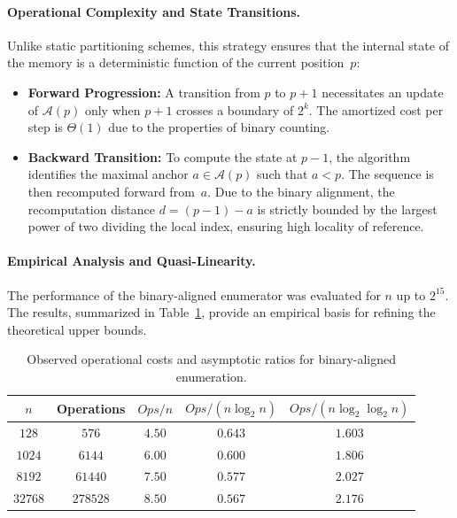 \documentclass[a4paper,10pt]{article}
\begin{document}
\paragraph{Operational Complexity and State Transitions.}
Unlike static partitioning schemes, this strategy ensures that the internal state of the memory is a deterministic function of the current position~\(p\):
\begin{itemize}
    \item \textbf{Forward Progression:} A transition from \(p\) to \(p+1\) necessitates an update of \(\mathcal{A}(p)\) only when \(p+1\) crosses a boundary of \(2^k\). The amortized cost per step is \(\Theta(1)\) due to the properties of binary counting.
    \item \textbf{Backward Transition:} To compute the state at \(p-1\), the algorithm identifies the maximal anchor \(a \in \mathcal{A}(p)\) such that \(a < p\). The sequence is then recomputed forward from~\(a\). Due to the binary alignment, the recomputation distance \(d = (p-1) - a\) is strictly bounded by the largest power of two dividing the local index, ensuring high locality of reference.
\end{itemize}

\paragraph{Empirical Analysis and Quasi-Linearity.}
The performance of the binary-aligned enumerator was evaluated for \(n\) up to \(2^{15}\). The results, summarized in Table~\ref{tab:complexity-ratios}, provide an empirical basis for refining the theoretical upper bounds.

\begin{table}[h]
\centering
\caption{Observed operational costs and asymptotic ratios for binary-aligned enumeration.}
\label{tab:complexity-ratios}
\begin{tabular}{ccccc}
\toprule
$n$ & Operations & $Ops / n$ & $Ops / (n \log_2 n)$ & $Ops / (n \log_2 \log_2 n)$ \\
\midrule
$128$   & $576$    & $4.50$ & $0.643$ & $1.603$ \\
$1024$  & $6144$   & $6.00$ & $0.600$ & $1.806$ \\
$8192$  & $61440$  & $7.50$ & $0.577$ & $2.027$ \\
$32768$ & $278528$ & $8.50$ & $0.567$ & $2.176$ \\
\bottomrule
\end{tabular}
\end{table}
\end{document}
